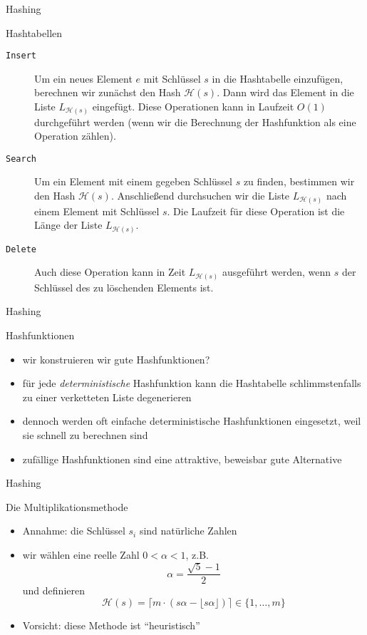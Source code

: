 \documentclass[aspectratio=1610, 11pt]{beamer}
\newcommand\cH{\mathcal H}
\begin{document}
\begin{frame}{Hashing}
	\begin{exampleblock}{Hashtabellen}
		\begin{description}
			\item[{\tt Insert}]
				Um ein neues Element $e$ mit Schl\"ussel $s$ in die Hashtabelle einzuf\"ugen, berechnen wir zun\"achst den Hash $\cH(s)$.
				Dann wird das Element in die Liste $L_{\cH(s)}$ eingef\"ugt.
				Diese Operationen kann in Laufzeit $O(1)$ durchgef\"uhrt werden (wenn wir die Berechnung der Hashfunktion als eine Operation z\"ahlen).
			\item[\tt Search]
				Um ein Element mit einem gegeben Schl\"ussel $s$ zu finden, bestimmen wir den Hash $\cH(s)$. 
				Anschlie\ss end durchsuchen wir die Liste $L_{\cH(s)}$ nach einem Element mit Schl\"ussel $s$.
				Die Laufzeit f\"ur diese Operation ist die L\"ange der Liste $L_{\cH(s)}$.
			\item[\tt Delete] Auch diese Operation kann in Zeit $L_{\cH(s)}$ ausgef\"uhrt werden, wenn $s$ der Schl\"ussel des zu l\"oschenden Elements ist.
		\end{description}
	\end{exampleblock}
\end{frame}

\begin{frame}{Hashing}
	\begin{exampleblock}{Hashfunktionen}
		\begin{itemize}
			\item wir konstruieren wir gute Hashfunktionen?
			\item f\"ur jede \emph{deterministische} Hashfunktion kann die Hashtabelle schlimmstenfalls zu einer verketteten Liste degenerieren
			\item dennoch werden oft einfache deterministische Hashfunktionen eingesetzt, weil sie schnell zu berechnen sind
			\item zuf\"allige Hashfunktionen sind eine attraktive, beweisbar gute Alternative
		\end{itemize}
	\end{exampleblock}
\end{frame}

\begin{frame}{Hashing}
	\begin{exampleblock}{Die Multiplikationsmethode}
		\begin{itemize}
			\item \alert{Annahme:} die Schl\"ussel $s_i$ sind nat\"urliche Zahlen
			\item wir w\"ahlen eine reelle Zahl $0<\alpha<1$, z.B. $$\alpha=\frac{\sqrt5-1}2$$ und definieren
				$$\cH(s)=\lceil m\cdot(s\alpha-\lfloor s\alpha\rfloor)\rceil\in\{1,\ldots,m\}$$
			\item \alert{Vorsicht:} diese Methode ist ``heuristisch''
		\end{itemize}
	\end{exampleblock}
\end{frame}
\end{document}
